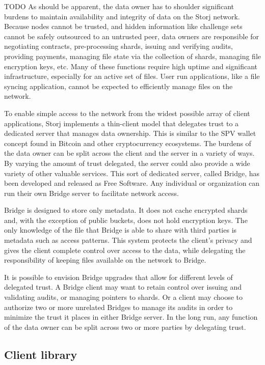 \documentclass[a4paper,10pt]{article} \usepackage[utf8]{inputenc}
\newcommand{\todo}[1]{{\color{red} TODO #1}}
\begin{document}
\todo{ As should be apparent, the data owner has to shoulder significant burdens
to maintain availability and integrity of data on the Storj network. Because
nodes cannot be trusted, and hidden information like challenge sets cannot be
safely outsourced to an untrusted peer, data owners are responsible for
negotiating contracts, pre-processing shards, issuing and verifying audits,
providing payments, managing file state via the collection of shards, managing
file encryption keys, etc. Many of these functions require high uptime and
significant infrastructure, especially for an active set of files. User run
applications, like a file syncing application, cannot be expected to efficiently
manage files on the network.

To enable simple access to the network from the widest possible array of client
applications, Storj implements a thin-client model that delegates trust to a
dedicated server that manages data ownership. This is similar to the SPV wallet
concept found in Bitcoin and other cryptocurrency ecosystems. The burdens of the
data owner can be split across the client and the server in a variety of ways.
By varying the amount of trust delegated, the server could also provide a wide
variety of other valuable services. This sort of dedicated server, called
Bridge, has been developed and released as Free Software. Any individual or
organization can run their own Bridge server to facilitate network access.

Bridge is designed to store only metadata. It does not cache encrypted shards
and, with the exception of public buckets, does not hold encryption keys. The
only knowledge of the file that Bridge is able to share with third parties is
metadata such as access patterns. This system protects the client's privacy and
gives the client complete control over access to the data, while delegating the
responsibility of keeping files available on the network to Bridge.

It is possible to envision Bridge upgrades that allow for different levels of
delegated trust. A Bridge client may want to retain control over issuing and
validating audits, or managing pointers to shards. Or a client may choose to
authorize two or more unrelated Bridges to manage its audits in order to
minimize the trust it places in either Bridge server. In the long run, any
function of the data owner can be split across two or more parties by delegating
trust. }

\subsection{Client library}
\end{document}
